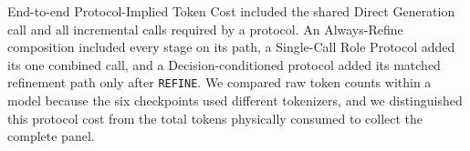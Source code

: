 End-to-end Protocol-Implied Token Cost included the shared Direct Generation call and all incremental calls required by a protocol.
An Always-Refine composition included every stage on its path, a Single-Call Role Protocol added its one combined call, and a Decision-conditioned protocol added its matched refinement path only after \texttt{REFINE}.
We compared raw token counts within a model because the six checkpoints used different tokenizers, and we distinguished this protocol cost from the total tokens physically consumed to collect the complete panel.
